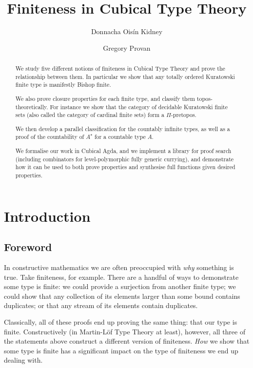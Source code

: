 
\title{Finiteness in Cubical Type Theory}
\author{
  Donnacha Oisín Kidney  \and
  Gregory Provan 
}

\maketitle
\begin{abstract}
  We study five different notions of finiteness in Cubical Type Theory and prove
  the relationship between them.
  In particular we show that any totally ordered Kuratowski finite type is
  manifestly Bishop finite.

  We also prove closure properties for each finite type, and classify them
  topos-theoretically.
  For instance we show that the category of decidable Kuratowski finite sets
  (also called the category of cardinal finite sets) form a \(\Pi\)-pretopos.

  We then develop a parallel classification for the countably infinite types, as
  well as a proof of the countability of \(A^\star\) for a countable type \(A\).

  We formalise our work in Cubical Agda, and we implement a library for proof
  search (including combinators for level-polymorphic fully generic currying),
  and demonstrate how it can be used to both prove properties and synthesise
  full functions given desired properties.
\end{abstract}

\section{Introduction}
\subsection{Foreword}
In constructive mathematics we are often preoccupied with \emph{why} something
is true.
Take finiteness, for example.
There are a handful of ways to demonstrate some type is finite: we could provide
a surjection from another finite type; we could show that any collection of its
elements larger than some bound contains duplicates; or that any stream of its
elements contain duplicates.

Classically, all of these proofs end up proving the same thing: that our type is
finite.
Constructively (in Martin-Löf Type Theory
\cite{martin-lofIntuitionisticTypeTheory1980} at least), however, all three
of the statements above construct a different version of finiteness.
\emph{How} we show that some type is finite has a significant impact on the
type of finiteness we end up dealing with.

